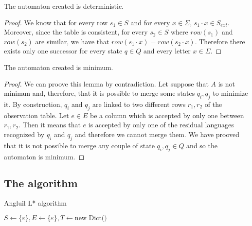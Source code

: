 \begin{lemma}
  The automaton created is deterministic.
\end{lemma}

\begin{proof}
  We know that for every row $s_1 \in S$ and for every $x \in \Sigma$, $s_1 \cdot x \in S_{ext}$. Moreover, since the table is consistent, for every $s_2 \in S$ where $row(s_1)$ and $row(s_2)$ are similar, we have that $row(s_1 \cdot x) = row(s_2 \cdot x)$. Therefore there exists only one successor for every state $q \in Q$ and every letter $x \in \Sigma$.
\end{proof}

\begin{lemma}
  The automaton created is minimum.
\end{lemma}

\begin{proof}
  We can proove this lemma by contradiction. Let suppose that $A$ is not minimun and, therefore, that it is possible to merge some states $q_i, q_j$ to minimize it.
  By construction, $q_i$ and $q_j$ are linked to two different rows $r_1, r_2$ of the observation table.
  Let $e \in E$ be a column which is accepted by only one between $r_1, r_2$.
  Then it means that $e$ is accepted by only one of the residual languages recognized by $q_i$ and $q_j$ and therefore we cannot merge them.
  We have prooved that it is not possible to merge any couple of state $q_i, q_j \in Q$ and so the automaton is minimum.
\end{proof}

\subsection{The algorithm}

\begin{algorithm}[H]
  \caption{Angluil L* algorithm}
  \label{L_star_algo}
  \KwIn{$\Sigma$}
  $S \gets \{\varepsilon\}, E \gets \{\varepsilon\}, T \gets \text{new Dict()}$\;
\end{algorithm}

